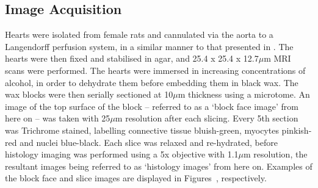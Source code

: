   \subsection{Image Acquisition} %
  \label{sub:image_acquisition}
    Hearts were isolated from female rats and cannulated via the aorta to a Langendorff perfusion system, in a similar manner to that presented in \cite{Burton2006}. The hearts were then fixed and stabilised in agar, and 25.4 x 25.4 x 12.7$\mu$m MRI scans were performed. The hearts were immersed in increasing concentrations of alcohol, in order to dehydrate them before embedding them in black wax. The wax blocks were then serially sectioned at 10$\mu$m thickness using a microtome. An image of the top surface of the block -- referred to as a `block face image' from here on -- was taken with 25$\mu$m resolution after each slicing. Every 5th section was Trichrome stained, labelling connective tissue bluish-green, myocytes pinkish-red and nuclei blue-black. Each slice was relaxed and re-hydrated, before histology imaging was performed using a 5x objective with 1.1$\mu$m resolution, the resultant images being referred to as `histology images' from here on. Examples of the block face and slice images are displayed in Figures~, respectively.
		
